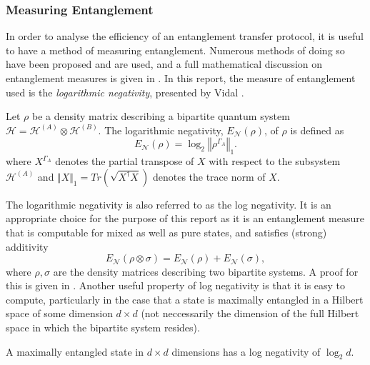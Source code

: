 \subsubsection{Measuring Entanglement}
\label{subsubsection:measure_entanglement}
In order to analyse the efficiency of an entanglement transfer protocol, it is useful to have a method of measuring entanglement.
Numerous methods of doing so have been proposed and are used, and a full
mathematical discussion on entanglement measures is given in \cite{Plenio_2007}.
In this report, the measure of entanglement used is the \emph{logarithmic negativity}, presented by Vidal \cite{Vidal_2002}.
\begin{definition}
    \label{definition:log_neg}
    Let $\rho$ be a density matrix describing a bipartite quantum system $\mathcal{H} = \mathcal{H}^{(A)} \otimes \mathcal{H}^{(B)}$.
    The logarithmic negativity, $E_\mathcal{N}(\rho)$, of $\rho$ is defined as
    \begin{equation}
        E_\mathcal{N}(\rho) = \log_2\left\Vert \rho^{\Gamma_A}\right\Vert_1.
    \end{equation}
    where $X^{\Gamma_A}$ denotes the partial transpose of $X$ with respect to the subsystem $\mathcal{H}^{(A)}$ and $\Vert X\Vert_1 = Tr(\sqrt{X^\dagger X})$ denotes the trace norm of $X$.
\end{definition}
The logarithmic negativity is also referred to as the log negativity.
It is an appropriate choice for the purpose of this report as it is an entanglement measure that is computable for mixed as well as pure states, and satisfies (strong) additivity
\begin{equation}
    E_\mathcal{N}(\rho \otimes \sigma) = E_\mathcal{N}(\rho) + E_\mathcal{N}(\sigma),
\end{equation}
where $\rho,\sigma$ are the density matrices describing two bipartite systems.
A proof for this is given in \cite{Vidal_2002}.
Another useful property of log negativity is that it is easy to compute, particularly in the case that a state is maximally entangled in a Hilbert space of some dimension $d\times d$ (not neccessarily the dimension of the full Hilbert space in which the bipartite system resides).
\begin{claim}
    \label{claim:maximally_entangled_states}
    A maximally entangled state in $d\times d$ dimensions has a log negativity of $\log_2d$.
\end{claim}
